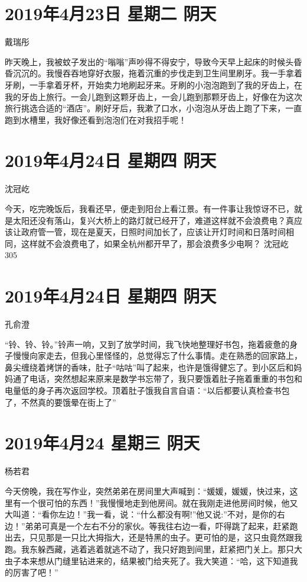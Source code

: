 \section{2019年4月23日 星期二 阴天}

戴瑞彤

昨天晚上，我被蚊子发出的``嗡嗡''声吵得不得安宁，导致今天早上起床的时候头昏昏沉沉的。我慢吞吞地穿好衣服，拖着沉重的步伐走到卫生间里刷牙。我一手拿着牙刷，一手拿着牙杯，开始卖力地刷起牙来。牙刷的小泡泡跑到了我的牙齿上，在我的牙齿上旅行。一会儿跑到这颗牙齿上，一会儿跑到那颗牙齿上，好像在为这次旅行挑选合适的``酒店''。刷好牙后，我漱了口水，小泡泡从牙齿上跑了下来，一直跑到水槽里，我好像还看到泡泡们在对我招手呢！

\section{2019年4月24日 星期四 阴天}

沈冠屹

今天，吃完晚饭后，我看还早，便走到阳台上看江景。有一件事让我惊讶不已，就是太阳还没有落山，复兴大桥上的路灯就已经开了，难道这样就不会浪费电？真应该让政府管一管，现在是夏天，日照时间加长了，应该让开灯时间和日落时间相同，这样就不会浪费电了，如果全杭州都开早了，那会浪费多少电啊？
沈冠屹 305

\section{2019年4月24日 星期四 阴天}

孔俞澄

``铃、铃、铃。''铃声一响，又到了放学时间，我飞快地整理好书包，拖着疲惫的身子慢慢向家走去，但我心里怪怪的，总觉得忘了什么事情。走在熟悉的回家路上，鼻尖缠绕着烤饼的香味，肚子``咕咕''叫了起来，也许是饿得健忘了。到小区后和妈妈通了电话，突然想起来原来是数学书忘带了，我只要饿着肚子拖着重重的书包和电量低的身子再次返回学校。顶着肚子饿我自言自语：``以后都要认真检查书包了，不然真的要饿晕在街上了''

\section{2019年4月24 星期三 阴天}

杨若君

今天傍晚，我在写作业，突然弟弟在房间里大声喊到：``媛媛，媛媛，快过来，这里有一个很可怕的东西！''我慢慢地走到他房间。就在我刚走进他房间时候，他又大叫道：``看你左边！''我一看，说：``什么都没有啊!''他又说:''不对，是你的右边！''弟弟可真是一个左右不分的家伙。等我往右边一看，吓得跳了起来，赶紧跑出去，只见那是一只比大拇指大，还是特黑的虫子。更可怕的是，这只虫竟然跟我跑。我东躲西藏，逃着逃着就逃不动了，我只好跑到间里，赶紧把门关上。那只大虫子本来想从门缝里钻进来的，结果被门给夹死了。我大笑道：``哈，这下知道我的厉害了吧！''

